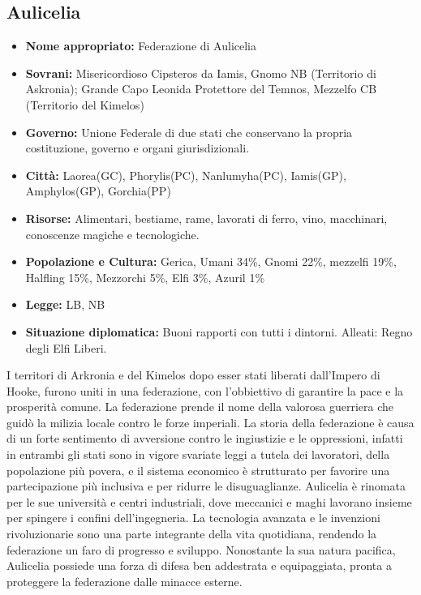 \documentclass[10pt, a4paper]{report}
\begin{document}
\begin{multicols}{2}
\subsection*{Aulicelia}
\begin{itemize}
	\item \textbf{Nome appropriato: }Federazione di Aulicelia
	\item \textbf{Sovrani: }Misericordioso Cipsteros da Iamis, Gnomo NB (Territorio di Askronia); Grande Capo Leonida Protettore del Temnos, Mezzelfo CB (Territorio del Kimelos)
	\item \textbf{Governo: }Unione Federale di due stati che conservano la propria costituzione, governo e organi giurisdizionali.
	\item \textbf{Città: }Laorea(GC), Phorylis(PC), Nanlumyha(PC), Iamis(GP), Amphylos(GP), Gorchia(PP)
	\item \textbf{Risorse: }Alimentari, bestiame, rame, lavorati di ferro, vino, macchinari, conoscenze magiche e tecnologiche.
	\item \textbf{Popolazione e Cultura: }Gerica, Umani 34\%, Gnomi 22\%, mezzelfi 19\%, Halfling 15\%, Mezzorchi 5\%, Elfi 3\%, Azuril 1\%
	\item \textbf{Legge:} LB, NB
	\item \textbf{Situazione diplomatica: }Buoni rapporti con tutti i dintorni. Alleati: Regno degli Elfi Liberi.
\end{itemize}
I territori di Arkronia e del Kimelos dopo esser stati liberati dall'Impero di Hooke, furono uniti in una federazione, con l'obbiettivo di garantire la pace e la prosperità comune. La federazione prende il nome della valorosa guerriera che guidò la milizia locale contro le forze imperiali. La storia della federazione è causa di un forte sentimento di avversione contro le ingiustizie e le oppressioni, infatti in entrambi gli stati sono in vigore svariate leggi a tutela dei lavoratori, della popolazione più povera, e il sistema economico è strutturato per favorire una partecipazione più inclusiva e per ridurre le disuguaglianze.  Aulicelia è rinomata per le sue università e centri industriali, dove meccanici e maghi lavorano insieme per spingere i confini dell'ingegneria. La tecnologia avanzata e le invenzioni rivoluzionarie sono una parte integrante della vita quotidiana, rendendo la federazione un faro di progresso e sviluppo. Nonostante la sua natura pacifica, Aulicelia possiede una forza di difesa ben addestrata e equipaggiata, pronta a proteggere la federazione dalle minacce esterne.


\end{multicols}
\end{document}
